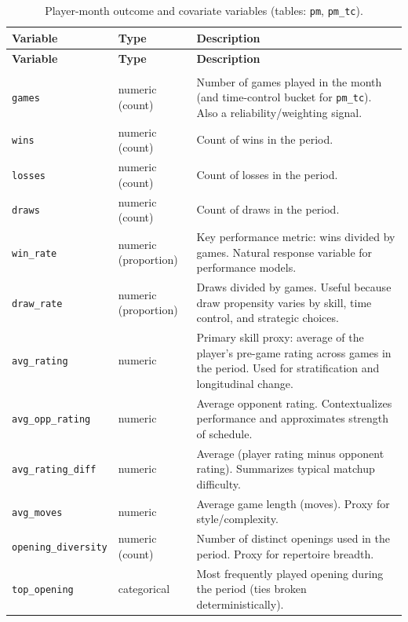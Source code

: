 \documentclass[
  12pt]{article}
\newcommand{\us}{\_\allowbreak}
\begin{document}
\begin{xltabular}{\textwidth}{>{\raggedright\arraybackslash}p{3.2cm} >{\raggedright\arraybackslash}p{2.6cm} X}
\caption{Player-month outcome and covariate variables (tables: \texttt{pm}, \texttt{pm\us tc}).}\label{tab:variables-player-month}\\
\toprule
\textbf{Variable} & \textbf{Type} & \textbf{Description} \\
\midrule
\endfirsthead

\toprule
\textbf{Variable} & \textbf{Type} & \textbf{Description} \\
\midrule
\endhead

\midrule
{} \\
\endfoot

\bottomrule
\endlastfoot

\texttt{games} & numeric (count) & Number of games played in the month (and time-control bucket for \texttt{pm\us tc}). Also a reliability/weighting signal. \\
\texttt{wins} & numeric (count) & Count of wins in the period. \\
\texttt{losses} & numeric (count) & Count of losses in the period. \\
\texttt{draws} & numeric (count) & Count of draws in the period. \\
\texttt{win\us rate} & numeric (proportion) & Key performance metric: wins divided by games. Natural response variable for performance models. \\
\texttt{draw\us rate} & numeric (proportion) & Draws divided by games. Useful because draw propensity varies by skill, time control, and strategic choices. \\
\texttt{avg\us rating} & numeric & Primary skill proxy: average of the player’s pre-game rating across games in the period. Used for stratification and longitudinal change. \\
\texttt{avg\us opp\us rating} & numeric & Average opponent rating. Contextualizes performance and approximates strength of schedule. \\
\texttt{avg\us rating\us diff} & numeric & Average (player rating minus opponent rating). Summarizes typical matchup difficulty. \\
\texttt{avg\us moves} & numeric & Average game length (moves). Proxy for style/complexity. \\
\texttt{opening\us diversity} & numeric (count) & Number of distinct openings used in the period. Proxy for repertoire breadth. \\
\texttt{top\us opening} & categorical & Most frequently played opening during the period (ties broken deterministically). \\
\end{xltabular}
\end{document}
